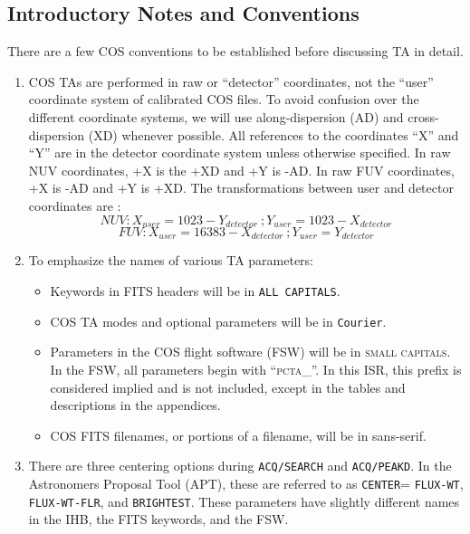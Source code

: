 \documentclass[12pt]{article}
\begin{document}
\subsection{Introductory Notes and Conventions}
\vspace{-0.3cm}
There are a few COS conventions to be established before discussing TA in detail.
\begin{enumerate}
	\item{COS TAs are performed in raw or ``detector'' coordinates, not the ``user'' coordinate system of calibrated
		COS files. To avoid confusion over the different coordinate systems, we will use along-dispersion (AD) and cross-dispersion
		(XD) whenever possible.
		All references to the coordinates ``X'' and ``Y'' are in the detector coordinate system unless otherwise
		specified.
		In raw NUV coordinates, +X is the +XD and +Y is -AD. In raw FUV coordinates, +X is -AD and +Y is +XD.
		The transformations between user and detector coordinates are :
		\begin{equation} NUV: X_{user} = 1023 - Y_{detector} \ ; Y_{user} = 1023-X_{detector} \end{equation}
		\begin{equation} FUV: X_{user} = 16383 - X_{detector} \ ; Y_{user} = Y_{detector} \end{equation}
		}
	\item{To emphasize the names of various TA parameters:
		\begin{itemize}
			\item{Keywords in FITS headers will be in \texttt{ALL CAPITALS}.}
			\item{COS TA modes and optional parameters will be in \texttt{Courier}.}
			\item{Parameters in the COS flight software (FSW) will be in \textsc{small capitals}.
In the FSW, all parameters begin with ``\textsc{pcta\_}''. In this ISR, this prefix is considered implied and is not included,
except in the tables and descriptions in the appendices.}
			\item{COS FITS filenames, or portions of a filename, will be in {\sf sans-serif}.}
		\end{itemize}
	}
	\item{There are three centering options during \texttt{ACQ/SEARCH} and \texttt{ACQ/PEAKD}. In the Astronomers Proposal Tool (APT), these are
		referred to as \texttt{CENTER}= \texttt{FLUX-WT}, \texttt{FLUX-WT-FLR}, and \texttt{BRIGHTEST}.
		These parameters have slightly different names in the IHB, the FITS keywords, and the FSW.
}
\end{enumerate}
\end{document}
